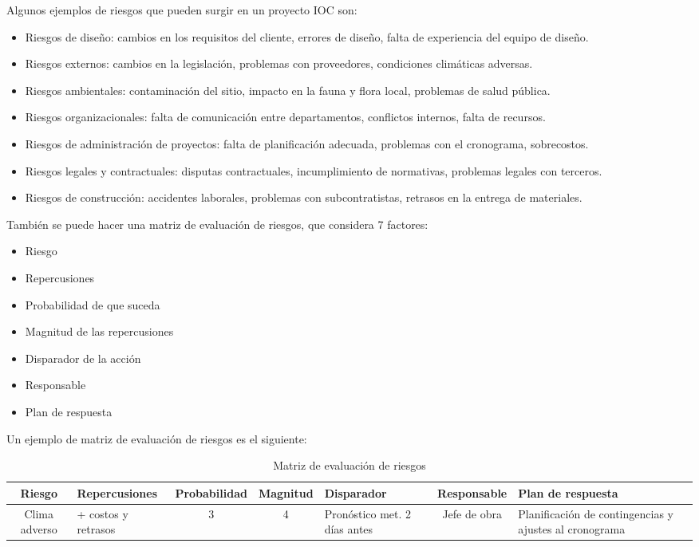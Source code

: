 Algunos ejemplos de riesgos que pueden surgir en un proyecto IOC son:
\begin{itemize}
    \item Riesgos de diseño: cambios en los requisitos del cliente, errores de diseño, falta de experiencia del equipo de diseño.
    \item Riesgos externos: cambios en la legislación, problemas con proveedores, condiciones climáticas adversas.
    \item Riesgos ambientales: contaminación del sitio, impacto en la fauna y flora local, problemas de salud pública.
    \item Riesgos organizacionales: falta de comunicación entre departamentos, conflictos internos, falta de recursos.
    \item Riesgos de administración de proyectos: falta de planificación adecuada, problemas con el cronograma, sobrecostos.
    \item Riesgos legales y contractuales: disputas contractuales, incumplimiento de normativas, problemas legales con terceros.
    \item Riesgos de construcción: accidentes laborales, problemas con subcontratistas, retrasos en la entrega de materiales.
\end{itemize}

También se puede hacer una matriz de evaluación de riesgos, que considera 7 factores:
\begin{itemize}
    \item Riesgo
    \item Repercusiones
    \item Probabilidad de que suceda
    \item Magnitud de las repercusiones
    \item Disparador de la acción 
    \item Responsable
    \item Plan de respuesta
\end{itemize}

Un ejemplo de matriz de evaluación de riesgos es el siguiente:
\begin{table}[h]
    \centering
    \small %
    \begin{tabularx}{\textwidth}{|c|X|c|c|X|c|X|}
        \hline
        \textbf{Riesgo} & \textbf{Repercusiones} & \textbf{Probabilidad} & \textbf{Magnitud} & \textbf{Disparador} & \textbf{Responsable} & \textbf{Plan de respuesta} \\
        \hline
        Clima adverso & + costos y retrasos & 3 & 4 & Pronóstico met. 2 días antes & Jefe de obra & Planificación de contingencias y ajustes al cronograma \\
        \hline
    \end{tabularx}
    \caption{Matriz de evaluación de riesgos}
\end{table}

